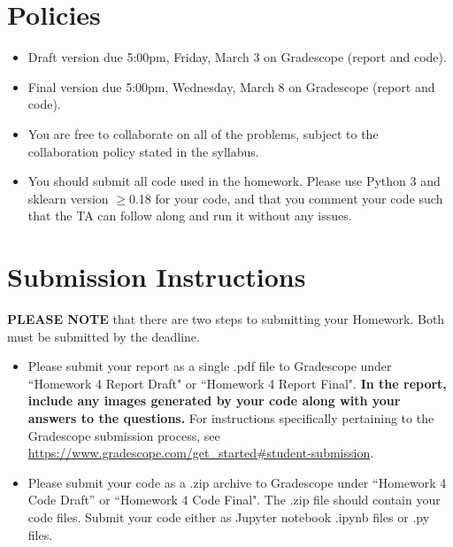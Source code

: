 \newif\ifshowsolutions
\showsolutionsfalse




\pagestyle{fancy}

\section*{Policies}

\begin{itemize}
	\item Draft version due 5:00pm, Friday, March 3 on Gradescope (report and code).
	\item Final version due 5:00pm, Wednesday, March 8 on Gradescope (report and code).
	\item You are free to collaborate on all of the problems, subject to the collaboration policy stated in the syllabus.
	\item You should submit all code used in the homework.
	      Please use Python 3 and sklearn version $\geq$0.18 for your code, and that you comment your code such that the TA can follow along and run it without any issues.
\end{itemize}

\section*{Submission Instructions}
\textbf{PLEASE NOTE} that there are two steps to submitting your Homework.
Both must be submitted by the deadline.

\begin{itemize}
	\item Please submit your report as a single .pdf file to Gradescope under ``Homework 4 Report Draft" or ``Homework 4 Report Final".
	      \textbf{In the report, include any images generated by your code along with your answers to the questions.}
	      For instructions specifically pertaining to the Gradescope submission process, see \url{https://www.gradescope.com/get_started#student-submission}.
	\item Please submit your code as a .zip archive to Gradescope under ``Homework 4 Code Draft'' or ``Homework 4 Code Final".
	      The .zip file should contain your code files.
	      Submit your code either as Jupyter notebook .ipynb files or .py files.
\end{itemize}

